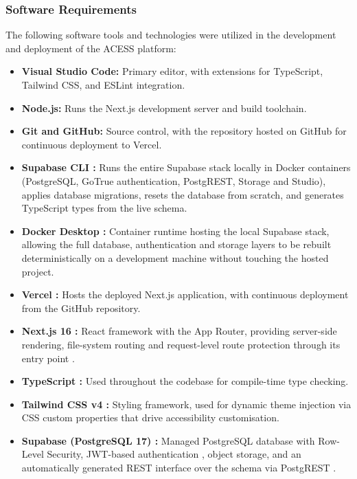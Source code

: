 \documentclass[12pt, oneside]{article} %
\newcommand{\tcode}[1]{\path{#1}}
\begin{document}
\subsubsection{Software Requirements}

The following software tools and technologies were utilized in the development and deployment of the ACESS platform:

\begin{itemize}
    \item \textbf{Visual Studio Code:} Primary editor, with extensions for TypeScript, Tailwind CSS, and ESLint integration.
    \item \textbf{Node.js:} Runs the Next.js development server and build toolchain.
    \item \textbf{Git and GitHub:} Source control, with the repository hosted on GitHub for continuous deployment to Vercel.
    \item \textbf{Supabase CLI \cite{supabase_cli}:} Runs the entire Supabase stack locally in Docker containers (PostgreSQL, GoTrue authentication, PostgREST, Storage and Studio), applies database migrations, resets the database from scratch, and generates TypeScript types from the live schema.
    \item \textbf{Docker Desktop \cite{docker_docs}:} Container runtime hosting the local Supabase stack, allowing the full database, authentication and storage layers to be rebuilt deterministically on a development machine without touching the hosted project.
    \item \textbf{Vercel \cite{vercel_docs}:} Hosts the deployed Next.js application, with continuous deployment from the GitHub repository.
    \item \textbf{Next.js 16 \cite{nextjs_ssr}:} React framework with the App Router, providing server-side rendering, file-system routing and request-level route protection through its \tcode{proxy} entry point \cite{nextjs_middleware}.
    \item \textbf{TypeScript \cite{typescript_docs}:} Used throughout the codebase for compile-time type checking.
    \item \textbf{Tailwind CSS v4 \cite{tailwind_docs}:} Styling framework, used for dynamic theme injection via CSS custom properties that drive accessibility customisation.
    \item \textbf{Supabase (PostgreSQL 17) \cite{supabase_docs,postgresql_docs}:} Managed PostgreSQL database with Row-Level Security, JWT-based authentication \cite{supabase_auth}, object storage, and an automatically generated REST interface over the schema via PostgREST \cite{postgrest_docs}.

\end{itemize}
\end{document}
